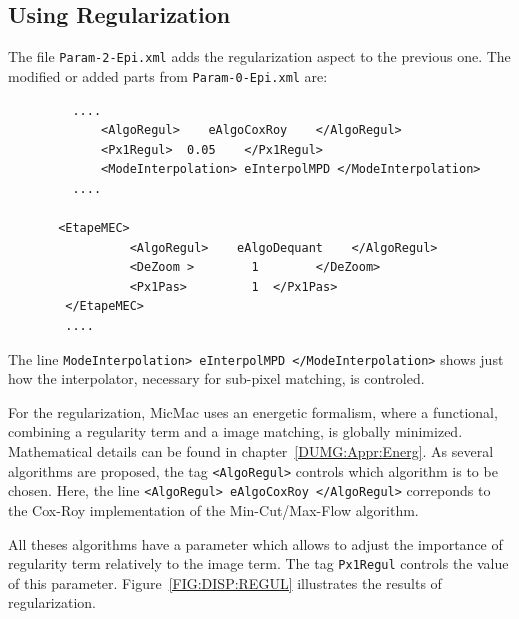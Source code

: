 \subsection{Using Regularization}

The file {\tt Param-2-Epi.xml} adds the regularization aspect
to the previous one. The modified or added  parts from
{\tt Param-0-Epi.xml} are:

{\scriptsize
\begin{verbatim}
         ....
             <AlgoRegul>    eAlgoCoxRoy    </AlgoRegul>
             <Px1Regul>  0.05    </Px1Regul>
             <ModeInterpolation> eInterpolMPD </ModeInterpolation>
         ....

       <EtapeMEC>
                 <AlgoRegul>    eAlgoDequant    </AlgoRegul>
                 <DeZoom >        1        </DeZoom>
                 <Px1Pas>         1  </Px1Pas>
        </EtapeMEC>
        ....

\end{verbatim}
}

The line {\tt ModeInterpolation> eInterpolMPD </ModeInterpolation>} shows
just how the interpolator, necessary for sub-pixel matching, is controled.


For the regularization, MicMac uses an energetic formalism, where a
functional, combining a regularity term and a image matching,
is globally minimized. Mathematical details can be found in
chapter~\ref{DUMG:Appr:Energ}. As several algorithms
are proposed, the tag  {\tt<AlgoRegul>} controls which
algorithm is to be chosen.  Here, the line
{\tt<AlgoRegul>    eAlgoCoxRoy    </AlgoRegul>}  correponds to
the Cox-Roy implementation of the Min-Cut/Max-Flow algorithm.

All theses algorithms have a parameter which allows to adjust 
the importance of regularity term relatively to the image term.
The tag {\tt Px1Regul} controls the value of this
parameter. Figure~\ref{FIG:DISP:REGUL} illustrates the results
of regularization.


